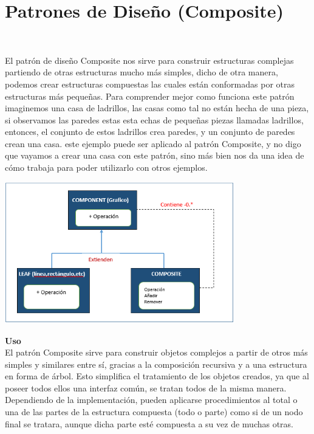 
\section{Patrones de Diseño (Composite)} 
\textbf{}\\
\begin{flushleft}
El patrón de diseño Composite nos sirve para construir estructuras complejas partiendo de otras estructuras mucho más simples, dicho de otra manera, podemos crear estructuras compuestas las cuales están conformadas por otras estructuras más pequeñas.
Para comprender mejor como funciona este patrón imaginemos una casa de ladrillos, las casas como tal no están hecha de una pieza, si observamos las paredes estas esta echas de pequeñas piezas llamadas ladrillos, entonces, el conjunto de estos ladrillos crea paredes, y un conjunto de paredes crean una casa. este ejemplo puede ser aplicado al patrón Composite, y no digo que vayamos a crear una casa con este patrón, sino más bien nos da una idea de cómo trabaja para poder utilizarlo con otros ejemplos.

\begin{center}
	\includegraphics[width=10cm]{./Imagenes/composite1} 
	\end{center}

\textbf{Uso}\\

El patrón Composite sirve para construir objetos complejos a partir de otros más simples y similares entre sí, gracias a la composición recursiva y a una estructura en forma de árbol.  Esto simplifica el tratamiento de los objetos creados, ya que al poseer todos ellos una interfaz común, se tratan todos de la misma manera. Dependiendo de la implementación, pueden aplicarse procedimientos al total o una de las partes de la estructura compuesta (todo o parte) como si de un nodo final se tratara, aunque dicha parte esté compuesta a su vez de muchas otras.


\end{flushleft}

